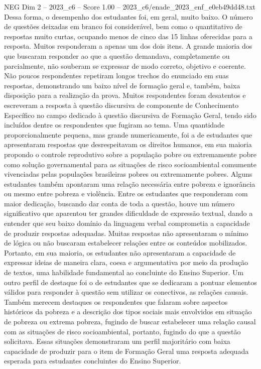 \begin{textsample}{NEG Dim 2 – 2023\_c6 – Score 1.00 – 2023\_c6/enade\_2023\_enf\_e0eb49dd48.txt}
Dessa forma, o desempenho dos estudantes foi, em geral, muito baixo.
O número de questões deixadas em branco foi considerável, bem como o quantitativo de respostas muito curtas, ocupando menos de cinco das 15 linhas oferecidas para a resposta.
Muitos responderam a apenas um dos dois itens.
A grande maioria dos que buscaram responder ao que a questão demandava, completamente ou parcialmente, não souberam se expressar de modo correto, objetivo e coerente.
Não poucos respondentes repetiram longos trechos do enunciado em suas respostas, demonstrando um baixo nível de formação geral e, também, baixa disposição para a realização da prova.
Muitos respondentes foram desatentos e escreveram a resposta à questão discursiva de componente de Conhecimento Específico no campo dedicado à questão discursiva de Formação Geral, tendo sido incluídos dentre os respondentes que fugiram ao tema.
Uma quantidade proporcionalmente pequena, mas grande numericamente, foi a de estudantes que apresentaram respostas que desrespeitavam os direitos humanos, em sua maioria propondo o controle reprodutivo sobre a população pobre ou extremamente pobre como solução governamental para as situações de risco socioambiental comumente vivenciadas pelas populações brasileiras pobres ou extremamente pobres.
Alguns estudantes também apontaram uma relação necessária entre pobreza e ignorância ou mesmo entre pobreza e violência.
Entre os estudantes que responderam com maior dedicação, buscando dar conta de toda a questão, houve um número significativo que aparentou ter grandes dificuldade de expressão textual, dando a entender que seu baixo domínio da linguagem verbal comprometia a capacidade de produzir respostas adequadas.
Muitas respostas não apresentaram o mínimo de lógica ou não buscaram estabelecer relações entre os conteúdos mobilizados.
Portanto, em sua maioria, os estudantes não apresentaram a capacidade de expressar ideias de maneira clara, coesa e argumentativa por meio da produção de textos, uma habilidade fundamental ao concluinte do Ensino Superior.
Um outro perfil de destaque foi o de estudantes que se dedicaram a pontuar elementos válidos para responder à questão sem utilizar os conectivos, as relações causais.
Também merecem destaques os respondentes que falaram sobre aspectos históricos da pobreza e a descrição dos tipos sociais mais envolvidos em situação de pobreza ou extrema pobreza, fugindo de buscar estabelecer uma relação causal com as situações de risco socioambiental, portanto, fugindo do que a questão solicitava.
Essas situações demonstraram um perfil majoritário com baixa capacidade de produzir para o item de Formação Geral uma resposta adequada esperada para estudantes concluintes do Ensino Superior.

\end{textsample}
